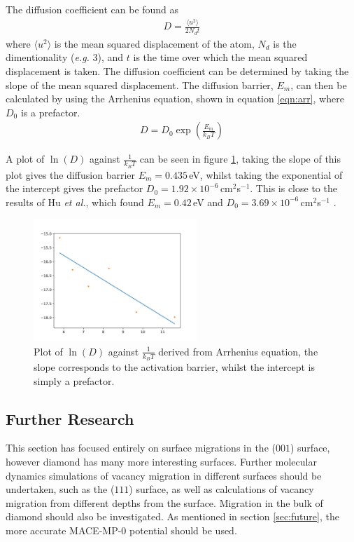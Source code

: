 \documentclass[10pt,a4paper,twocolumn,twoside]{extarticle}
\newcommand{\al}{\emph{et al.}}
\begin{document}
The diffusion coefficient can be found as 
\begin{align}
	D = \frac{\langle u^2 \rangle}{2N_dt}
\end{align}
where $\langle u^2 \rangle$ is the mean squared displacement of the atom, $N_d$ is the dimentionality (\emph{e.g.} 3), and $t$ is the time over which the mean squared displacement is taken. The diffusion coefficient can be determined by taking the slope of the mean squared displacement. The diffusion barrier, $E_m$, can then be calculated by using the Arrhenius equation, shown in equation \ref{eqn:arr}, where $D_0$ is a prefactor. 
\begin{align}
	\label{eqn:arr}
	D = D_0 \exp(\frac{E_m}{k_BT})
\end{align}

A plot of $\ln(D)$ against $\frac{1}{k_BT}$ can be seen in figure \ref{fig:arr}, taking the slope of this plot gives the diffusion barrier $E_m = 0.435$\,eV, whilst taking the exponential of the intercept gives the prefactor $D_0 = 1.92\times10^{-6}$\,cm$^2$s$^{-1}$. This is close to the results of Hu \al, which found $E_m = 0.42$\,eV and $D_0 = 3.69\times10^{-6}$\,cm$^2$s$^{-1}$ \cite{hu}.

\begin{figure}
	\includegraphics*[width=0.55\textwidth]{hu.png}
	\caption{Plot of $\ln(D)$ against $\frac{1}{k_BT}$ derived from  Arrhenius equation, the slope corresponds  to the activation barrier, whilst the intercept is simply a prefactor.}
	\label{fig:arr}
\end{figure}

\subsection{Further Research}
This section has focused entirely on surface migrations in the ($001$) surface, however diamond has many more interesting surfaces. Further molecular dynamics simulations of vacancy migration in different surfaces should be undertaken, such as the ($111$) surface, as well as calculations of vacancy migration from different depths from the surface. Migration in the bulk of diamond should also be investigated.
As mentioned in section \ref{sec:future}, the more accurate MACE-MP-0 potential \cite{MACE} should be used. 
\end{document}

